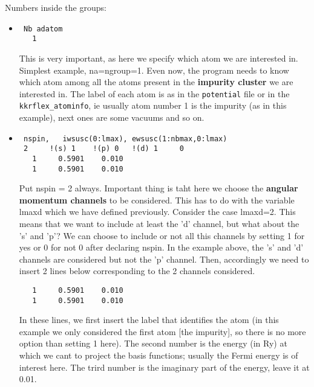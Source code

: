 \documentclass[11pt,fleqn]{book} %
\begin{document}
Numbers inside the groups:

\begin{itemize}
\item

\begin{VBox}
\begin{verbatim}
 Nb adatom
   1
\end{verbatim}
\end{VBox}
This is very important, as here we specify which atom we are interested in.
Simplest example, na=ngroup=1. Even now, the program needs to know
which atom among all the atoms
present in the \textbf{impurity cluster} we are interested in. The label of each atom
is as in the \verb|potential| file or in the \verb|kkrflex_atominfo|,
ie usually atom number 1 is the impurity (as in this example),
next ones are some vacuums and so on.

\item
\begin{VBox}
\begin{verbatim}
 nspin,   iwsusc(0:lmax), ewsusc(1:nbmax,0:lmax)
 2     !(s) 1    !(p) 0   !(d) 1     0
   1     0.5901    0.010
   1     0.5901    0.010
\end{verbatim}
\end{VBox}
Put nspin = 2 always. Important thing is taht here we choose
the \textbf{angular momentum channels} to be considered.
This has to do with the variable lmaxd which we have defined previously.
Consider the case lmaxd=2. This means that we want to include at least the 'd'
channel, but what about the 's' and 'p'? We can choose to include or not all
this channels by setting 1 for yes or 0 for not 0 after declaring nspin.
In the example above, the 's' and 'd' channels are considered
but not the 'p' channel.  Then, accordingly we need to insert
2 lines below corresponding to the 2 channels considered.
\begin{VBox}
\begin{verbatim}
   1     0.5901    0.010
   1     0.5901    0.010
\end{verbatim}
\end{VBox}
In these lines, we first insert the label that identifies the
atom (in this example we only considered the first atom [the impurity],
so there is no more option than setting 1 here). The second number is the
energy (in Ry) at which we cant to project the basis functions; usually the Fermi energy is
of interest here. The trird number is the imaginary part of the energy, leave it
at 0.01.

\end{itemize}
\end{document}
